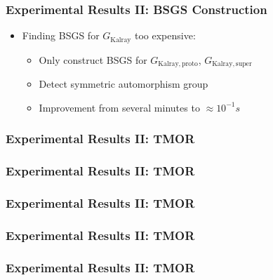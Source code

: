 \documentclass{beamer}
\newcommand{\inputressource}[1]{}
\begin{document}
\begin{frame}
  \frametitle{Experimental Results II: BSGS Construction}

  \begin{itemize}
    \item<1-> Finding BSGS for $G_{\mathrm{Kalray}}$ too expensive:
      \begin{itemize}
        \setlength\itemsep{.25cm}

        \item<2-> Only construct BSGS for $G_{\mathrm{Kalray,proto}}$,
                  $G_{\mathrm{Kalray,super}}$
        \item<3-> Detect symmetric automorphism group
        \item<4-> Improvement from several minutes to $\approx 10^{-1}s$
      \end{itemize}
  \end{itemize}
\end{frame}

\begin{frame}
  \frametitle{Experimental Results II: TMOR}

  \scalebox{.7}{\inputressource{exynos_lineplot.tex}}
\end{frame}

\begin{frame}
  \frametitle{Experimental Results II: TMOR}

  \scalebox{.7}{\inputressource{parallella_lineplot.tex}}
\end{frame}

\begin{frame}
  \frametitle{Experimental Results II: TMOR}

  \scalebox{.7}{\inputressource{haec_lineplot.tex}}
\end{frame}

\begin{frame}
  \frametitle{Experimental Results II: TMOR}

  \scalebox{.7}{\inputressource{haec_histogram.tex}}
\end{frame}

\begin{frame}
  \frametitle{Experimental Results II: TMOR}

  \scalebox{.7}{\inputressource{kalray_lineplot.tex}}
\end{frame}
\end{document}
